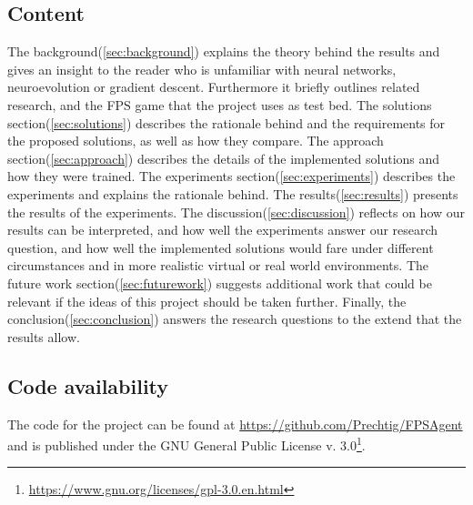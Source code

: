 \subsection{Content}
The background(\ref{sec:background}) explains the theory behind the results and gives an insight to the reader who is unfamiliar with neural networks, neuroevolution or gradient descent. Furthermore it briefly outlines related research, and the FPS game that the project uses as test bed. The solutions section(\ref{sec:solutions}) describes the rationale behind and the requirements for the proposed solutions, as well as how they compare. The approach section(\ref{sec:approach}) describes the details of the implemented solutions and how they were trained. The experiments section(\ref{sec:experiments}) describes the experiments and explains the rationale behind. The results(\ref{sec:results}) presents the results of the experiments. The discussion(\ref{sec:discussion}) reflects on how our results can be interpreted, and how well the experiments answer our research question, and how well the implemented solutions would fare under different circumstances and in more realistic virtual or real world environments. The future work section(\ref{sec:futurework}) suggests additional work that could be relevant if the ideas of this project should be taken further. Finally, the conclusion(\ref{sec:conclusion}) answers the research questions to the extend that the results allow.

\subsection{Code availability}
The code for the project can be found at \url{https://github.com/Prechtig/FPSAgent} and is published under the GNU General Public License v. 3.0\footnote{\url{https://www.gnu.org/licenses/gpl-3.0.en.html}}.

























